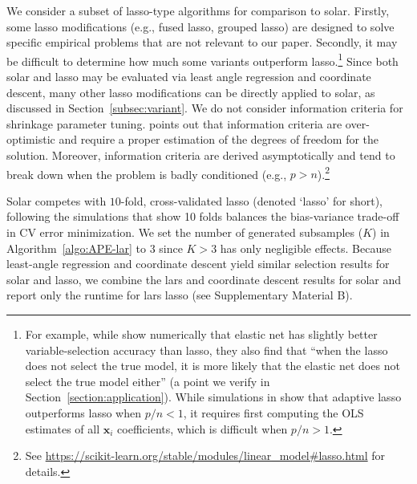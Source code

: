 \documentclass[11pt,review,authoryear]{elsarticle}
\begin{document}
We consider a subset of lasso-type algorithms for comparison to solar. Firstly, some lasso modifications (e.g., fused lasso, grouped lasso) are designed to solve specific empirical problems that are not relevant to our paper. Secondly, it may be difficult to determine how much some variants outperform lasso.\footnote{For example, while \citet{jia2010model} show numerically that elastic net has slightly better variable-selection accuracy than lasso, they also find that ``when the lasso does not select the true model, it is more likely that the elastic net does not select the true model either'' (a point we verify in Section~\ref{section:application}). While simulations in \citet{zou2006adaptive} show that adaptive lasso outperforms lasso when $p/n<1$, it requires first computing the OLS estimates of all $\mathbf{x}_i$ coefficients, which is difficult when $p/n>1$.} Since both solar and lasso may be evaluated via least angle regression and coordinate descent, many other lasso modifications can be directly applied to solar, as discussed in Section~\ref{subsec:variant}. We do not consider information criteria for shrinkage parameter tuning. \citet{scikit-learn} points out that information criteria are over-optimistic and require a proper estimation of the degrees of freedom for the solution. Moreover, information criteria are derived asymptotically and tend to break down when the problem is badly conditioned (e.g., $p > n$).\footnote{See \url{https://scikit-learn.org/stable/modules/linear_model\#lasso.html} for details.}

Solar competes with $10$-fold, cross-validated lasso (denoted `lasso' for short), following the \citet{friedman2001elements} simulations that show 10 folds balances the bias-variance trade-off in CV error minimization. We set the number of generated subsamples ($K$) in Algorithm~\ref{algo:APE-lar} to $3$ since $K>3$ has only negligible effects. Because least-angle regression and coordinate descent yield similar selection results for solar and lasso, we combine the lars and coordinate descent results for solar and report only the runtime for lars lasso (see Supplementary Material B).
\end{document}
